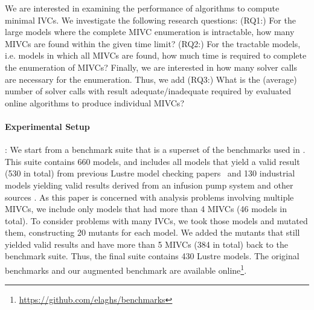 We are interested in examining the performance of algorithms to compute minimal IVCs.  
We investigate the following research questions: (RQ1:) For the large models where the complete MIVC enumeration is intractable, 
how many MIVCs are found within the given time limit?  (RQ2:) For the tractable models, i.e. models in which all MIVCs are found, how much time is required to complete the enumeration of MIVCs?  Finally, we are interested in how many solver calls are necessary for the enumeration.  Thus, we add (RQ3:) What is the (average) number of solver calls with result adequate/inadequate required by evaluated online algorithms to produce individual MIVCs?

\paragraph{Experimental Setup}:  We start from a benchmark suite that is a superset of the benchmarks used in \cite{Ghass17AllIVCs}. This suite contains 660 models, and includes all models that yield a valid result (530 in total) from previous Lustre model checking papers~\cite{Hagen08:FMCAD,piskac2016} and 130 industrial models yielding valid results derived from an infusion pump system \cite{hilt2013} and other sources \cite{piskac2016,NFM2015:backes}.
As this paper is concerned with analysis problems involving multiple MIVCs, we include only models that had more than 4 MIVCs (46 models in total).  To consider problems with many IVCs, we took those models and mutated them, constructing 20 mutants for each model.   
We added the mutants that still yielded valid results and have more than 5 MIVCs (384 in total) back to the benchmark suite.
Thus, the final suite contains 430 Lustre models. The original benchmarks and our augmented benchmark are available online\footnote{\url{https://github.com/elaghs/benchmarks}}. 

